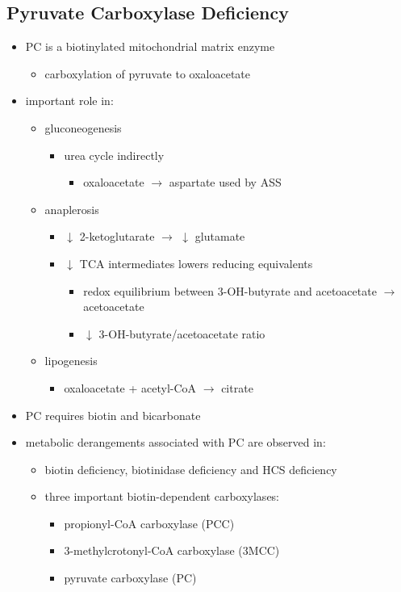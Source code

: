 \documentclass[12pt]{scrartcl}
\begin{document}
\subsection{Pyruvate Carboxylase Deficiency}
\label{sec:orgdd06ad3}
\begin{itemize}
\item PC is a biotinylated mitochondrial matrix enzyme
\begin{itemize}
\item carboxylation of pyruvate to oxaloacetate
\end{itemize}


\item important role in:
\begin{itemize}
\item gluconeogenesis
\begin{itemize}
\item urea cycle indirectly
\begin{itemize}
\item oxaloacetate \(\to\) aspartate used by ASS
\end{itemize}
\end{itemize}
\item anaplerosis
\begin{itemize}
\item \(\downarrow\) 2-ketoglutarate \(\to\) \(\downarrow\) glutamate
\item \(\downarrow\) TCA intermediates lowers reducing equivalents
\begin{itemize}
\item redox equilibrium between 3-OH-butyrate and acetoacetate \(\to\) acetoacetate
\item \(\downarrow\) 3-OH-butyrate/acetoacetate ratio
\end{itemize}
\end{itemize}
\item lipogenesis
\begin{itemize}
\item oxaloacetate + acetyl-CoA \(\to\) citrate
\end{itemize}
\end{itemize}

\item PC requires biotin and bicarbonate
\item metabolic derangements associated with PC are observed in:
\begin{itemize}
\item biotin deficiency, biotinidase deficiency and HCS deficiency
\item three important biotin-dependent carboxylases:
\begin{itemize}
\item propionyl-CoA carboxylase (PCC)
\item 3-methylcrotonyl-CoA carboxylase (3MCC)
\item pyruvate carboxylase (PC)
\end{itemize}


\end{itemize}
\end{itemize}
\end{document}
